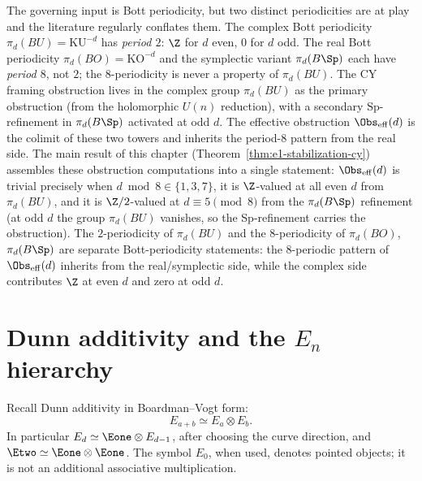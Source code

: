 The governing input is Bott periodicity, but two distinct periodicities are at play and the literature regularly conflates them. The complex Bott periodicity $\pi_d(BU) = \mathrm{KU}^{-d}$ has \emph{period $2$}: $\Z$ for $d$ even, $0$ for $d$ odd. The real Bott periodicity $\pi_d(BO) = \mathrm{KO}^{-d}$ and the symplectic variant $\pi_d(B\Sp)$ each have \emph{period $8$}, not $2$; the $8$-periodicity is never a property of $\pi_d(BU)$. The CY framing obstruction lives in the complex group $\pi_d(BU)$ as the primary obstruction (from the holomorphic $U(n)$ reduction), with a secondary $\mathrm{Sp}$-refinement in $\pi_d(B\Sp)$ activated at odd $d$. The effective obstruction $\Obs_{\mathrm{eff}}(d)$ is the colimit of these two towers and inherits the period-$8$ pattern from the real side. The main result of this chapter (Theorem~\ref{thm:e1-stabilization-cy}) assembles these obstruction computations into a single statement: $\Obs_{\mathrm{eff}}(d)$ is trivial precisely when $d \bmod 8 \in \{1, 3, 7\}$, it is $\Z$-valued at all even $d$ from $\pi_d(BU)$, and it is $\Z/2$-valued at $d \equiv 5 \pmod 8$ from the $\pi_d(B\Sp)$ refinement (at odd $d$ the group $\pi_d(BU)$ vanishes, so the Sp-refinement carries the obstruction). The $2$-periodicity of $\pi_d(BU)$ and the $8$-periodicity of $\pi_d(BO)$, $\pi_d(B\Sp)$ are separate Bott-periodicity statements: the $8$-periodic pattern of $\Obs_{\mathrm{eff}}(d)$ inherits from the real/symplectic side, while the complex side contributes $\Z$ at even $d$ and zero at odd $d$.


\section{Dunn additivity and the \texorpdfstring{$E_n$}{E-n} hierarchy}
\label{sec:dunn-additivity}

Recall Dunn additivity in Boardman--Vogt form:
\[
 E_{a+b}\simeq E_a\otimes E_b .
\]
In particular \(E_d\simeq \Eone\otimes E_{d-1}\), after choosing the
curve direction, and \(\Etwo\simeq \Eone\otimes\Eone\).  The symbol
\(E_0\), when used, denotes pointed objects; it is not an additional
associative multiplication.


